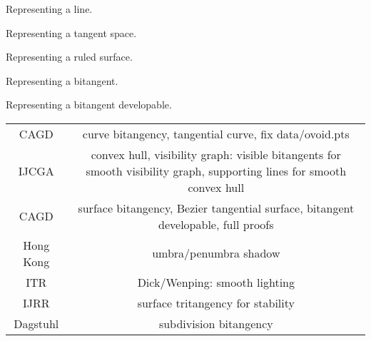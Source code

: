 \documentclass[10pt]{article}
\begin{document}
Representing a line.

Representing a tangent space.

Representing a ruled surface.

Representing a bitangent.

Representing a bitangent developable.

\begin{table}
\begin{tabular}{|c|c|} \hline
CAGD & curve bitangency, tangential curve, fix data/ovoid.pts \\
IJCGA & convex hull, visibility graph: visible bitangents for smooth visibility graph, supporting lines for smooth convex hull \\
CAGD & surface bitangency, Bezier tangential surface, bitangent developable, full proofs \\
Hong Kong & umbra/penumbra shadow \\
ITR & Dick/Wenping: smooth lighting \\
IJRR & surface tritangency for stability \\
Dagstuhl & subdivision bitangency \\
\hline
\end{tabular}
\end{table}
\end{document}
